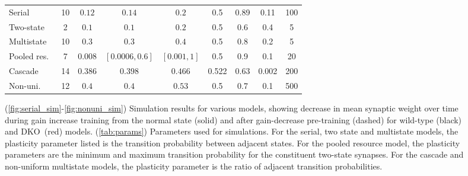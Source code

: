 \documentclass[10pt]{article}
\renewenvironment{myenumA}{\begin{inparaenum}[\bfseries A]}{\end{inparaenum}}
\newcommand{\KO}{DKO}
\begin{document}
\begin{figure}[p]
\begin{preview}
\begin{myenumA}
{\begin{tabular}{|l|c|c|c|c|c|c|c|c|}
    \cline{1-9}
    Serial   & 10 & $0.12$  & $0.14$  & $0.2$  & 0.5 & 0.89 & 0.11  & 100  \\%
    Two-state     & 2  & $0.1$  & $0.1$  & $0.2$  & 0.5 & 0.6 & 0.4  & 5   \\%
    Multistate    & 10 & $0.3$  & $0.3$  & $0.4$  & 0.5 & 0.8 & 0.2  & 5   \\%
    Pooled res.\ & 7  & $0.008$        & $[0.0006,0.6]$  & $[0.001,1]$
                                          & 0.5 & 0.9 & 0.1 & 20 \\%
    Cascade  & 14 & $0.386$  & $0.398$  & $0.466$  & 0.522 & 0.63 & 0.002  & 200  \\%
    Non-uni.\ & 12 & $0.4$    & $0.4$    & $0.53$   & 0.5 & 0.7 & 0.1 & 500  \\%
    \cline{1-9}
  \end{tabular}}
  \end{myenumA}
\end{preview}
  \caption[Simulation results for various models]{(\ref{fig:serial_sim}-\ref{fig:nonuni_sim}) Simulation results for various models, showing decrease in mean synaptic weight over time during gain increase training from the normal state (solid) and after gain-decrease pre-training (dashed) for wild-type (black) and \KO\ (red) models.
  (\ref{tab:params}) Parameters used for simulations.
  For the serial, two state and multistate models, the plasticity parameter listed is the transition probability between adjacent states.
  For the pooled resource model, the plasticity parameters are the minimum and maximum transition probability for the constituent two-state synapses.
  For the cascade and non-uniform multistate models, the plasticity parameter is the ratio of adjacent transition probabilities.}\label{fig:sim_results}
\end{figure}
\end{document}
